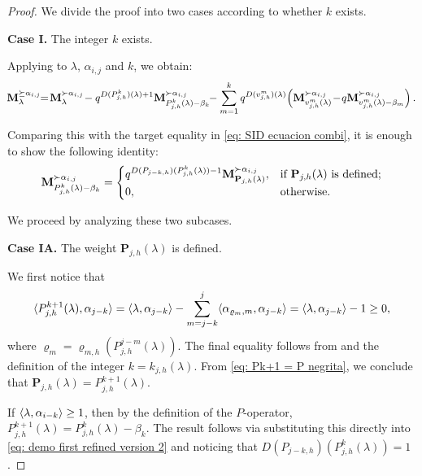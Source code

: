 \begin{proof}
We divide the proof into two cases according to whether $k$ exists.

\textbf{Case I. } The integer $k$ exists. 

Applying  to $\lambda$, $\alpha_{i,j}$ and $k$, we obtain:
\begin{equation}\label{eq: demo first refined version 1}
    \!  \bfM_{\lambda}^{\succeq \alpha_{i,j}}\! \!  = \! \bfM_{\lambda}^{\succ \alpha_{i,j}} \!  - q^{D(P^{k}_{j,h})(\lambda)+1} \bfM_{P^{k}_{j,h}(\lambda) - \beta_{k}}^{\succ \alpha_{i,j}}\! \!  -  \displaystyle\sum_{m=1}^{k} q^{D(v^{m}_{j,h})(\lambda)} \! \left( \bfM_{v^{m}_{j,h}(\lambda)}^{\succ \alpha_{i,j}}\!  -\!  q\bfM_{v^{m}_{j,h}(\lambda)-\beta_m}^{\succ \alpha_{i,j}}\right).
\end{equation}

Comparing this with the target equality  in \eqref{eq: SID ecuacion combi}, it is enough to show the following identity:
\begin{equation}\label{eq: demo first refined version 2}
    \mathbf{M}_{P^{k}_{j,h}(\lambda) - \beta_{k}}^{\succ \alpha_{i,j}}  =  \begin{cases}
        q^{D(P_{j-k,h})(P^{k}_{j,h}(\lambda))-1}\mathbf{M}_{\mathbf{P}_{j,h}(\lambda)}^{\succ \alpha_{i,j}},& \text{if }\mathbf{P}_{j,h}(\lambda) \text{ is defined};\\
        0,&\text{otherwise}.
    \end{cases}
\end{equation}

We proceed by analyzing these two subcases.

\medskip
\noindent
\textbf{Case IA.} The weight $\mathbf{P}_{j,h}(\lambda)$ is defined.

We first notice that 
\begin{equation}\label{eq: Pk+1 = P negrita}
    \langle P^{k+1}_{j,h}(\lambda) , \alpha_{j-k} \rangle = \langle \lambda , \alpha_{j-k} \rangle - \sum_{m=j-k}^{j}\langle \alpha_{\varrho_{m},m} , \alpha_{j-k} \rangle = \langle \lambda , \alpha_{j-k} \rangle - 1 \geq 0,
\end{equation}
where $\varrho_{m} = \varrho_{m,h}(P^{j-m}_{j,h}(\lambda))$. The final equality follows from  and the definition of the integer $k = k_{j,h}(\lambda)$. 
From \eqref{eq: Pk+1 = P negrita}, we conclude that $\mathbf{P}_{j,h}(\lambda) = P^{k+1}_{j,h}(\lambda)$.


If $\langle \lambda , \alpha_{i-k} \rangle \geq 1$, then by the definition of the $P$-operator, $P^{k+1}_{j,h}(\lambda)= P^{k}_{j,h}(\lambda) - \beta_{k}$.
The result follows via substituting this directly into \eqref{eq: demo first refined version 2} and noticing that $D(P_{j-k,h})(P^{k}_{j,h}(\lambda)) = 1$.


\end{proof}
